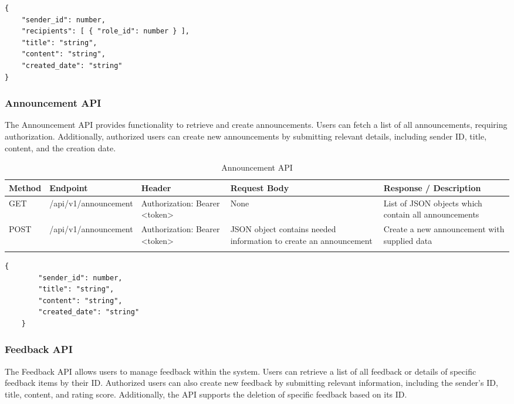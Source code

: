 \begin{lstlisting}[breaklines=true, caption=Notification Schema]
{
	"sender_id": number,
	"recipients": [ { "role_id": number } ],
	"title": "string",
	"content": "string",
	"created_date": "string"
}
\end{lstlisting}


\subsubsection{Announcement API}
The Announcement API provides functionality to retrieve and create announcements. Users can fetch a list of all announcements, requiring authorization. Additionally, authorized users can create new announcements by submitting relevant details, including sender ID, title, content, and the creation date.
\begin{longtable}{|m{1.6cm}|m{5cm}|m{3cm}|m{3cm}|m{3cm}|}
	\hline
	\textbf{Method} & \textbf{Endpoint} & \textbf{Header}                                                                                                                            & \textbf{Request Body} & \textbf{Response / Description}   \\ \hline
	\endhead
	
	GET & /api/v1/announcement & Authorization: Bearer <token>  & None & List of JSON objects which contain all announcements\\ \hline
	
	POST & /api/v1/announcement & Authorization: Bearer <token>  & JSON object contains needed information to create an announcement & Create a new announcement with supplied data\\ \hline
	
	
	\caption{Announcement API}
	\label{tab:announcement-api}
	
\end{longtable}

\begin{lstlisting}[breaklines=true, caption=Notification Schema]
	{
		"sender_id": number,
		"title": "string",
		"content": "string",
		"created_date": "string"
	}
\end{lstlisting}



\subsubsection{Feedback API}
The Feedback API allows users to manage feedback within the system. Users can retrieve a list of all feedback or details of specific feedback items by their ID. Authorized users can also create new feedback by submitting relevant information, including the sender's ID, title, content, and rating score. Additionally, the API supports the deletion of specific feedback based on its ID.

